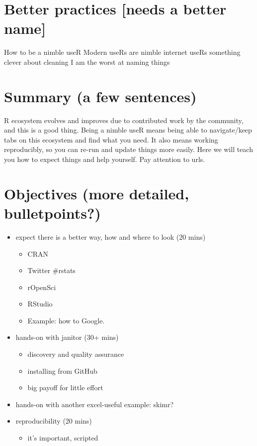 \documentclass[]{book}
\providecommand{\tightlist}{%
  \setlength{\itemsep}{0pt}\setlength{\parskip}{0pt}}
\begin{document}
\hypertarget{better-practices-needs-a-better-name}{%
\section{Better practices {[}needs a better name{]}}\label{better-practices-needs-a-better-name}}

How to be a nimble useR
Modern useRs are nimble internet useRs
something clever about cleaning
I am the worst at naming things

\hypertarget{summary-a-few-sentences-3}{%
\section{Summary (a few sentences)}\label{summary-a-few-sentences-3}}

R ecosystem evolves and improves due to contributed work by the community, and this is a good thing. Being a nimble useR means being able to navigate/keep tabs on this ecosystem and find what you need. It also means working reproducibly, so you can re-run and update things more easily. Here we will teach you how to expect things and help yourself. Pay attention to urls.

\hypertarget{objectives-more-detailed-bulletpoints-3}{%
\section{Objectives (more detailed, bulletpoints?)}\label{objectives-more-detailed-bulletpoints-3}}

\begin{itemize}
\tightlist
\item
  expect there is a better way, how and where to look (20 mins)

  \begin{itemize}
  \tightlist
  \item
    CRAN
  \item
    Twitter \#rstats
  \item
    rOpenSci
  \item
    RStudio
  \item
    Example: how to Google.
  \end{itemize}
\item
  hands-on with janitor (30+ mins)

  \begin{itemize}
  \tightlist
  \item
    discovery and quality assurance
  \item
    installing from GitHub
  \item
    big payoff for little effort
  \end{itemize}
\item
  hands-on with another excel-useful example: skimr?\\
\item
  reproducibility (20 mins)

  \begin{itemize}
  \tightlist
  \item
    it's important, scripted
  \end{itemize}
\end{itemize}
\end{document}
